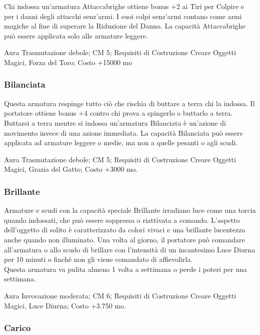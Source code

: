 \begin{multicols}{2}
Chi indossa un'armatura Attaccabrighe ottiene bonus +2 ai Tiri per Colpire e per i danni degli attacchi senz'armi. I suoi colpi senz'armi contano come armi magiche al fine di superare la Riduzione del Danno. La capacità Attaccabrighe può essere applicata solo alle armature leggere.

Aura Trasmutazione debole; CM 5; Requisiti di Costruzione Creare Oggetti Magici, Forza del Toro; Costo +15000 mo

\subsubsection{Bilanciata}

Questa armatura respinge tutto ciò che rischia di buttare a terra chi la indossa. Il portatore ottiene bonus +4 contro chi prova a spingerlo o buttarlo a terra.\\
Buttarsi a terra mentre si indossa un'armatura Bilanciata è un'azione di movimento invece di una azione immediata. La capacità Bilanciata può essere applicata ad armature leggere o medie, ma non a quelle pesanti o agli scudi.

Aura Trasmutazione debole; CM 5; Requisiti di Costruzione Creare Oggetti Magici, Grazia del Gatto; Costo +3000 mo.

\subsubsection{Brillante}

Armature e scudi con la capacità speciale Brillante irradiano luce come una torcia quando indossati, che può essere soppressa o riattivata a comando. L'aspetto dell'oggetto di solito è caratterizzato da colori vivaci e una brillante lucentezza anche quando non illuminato. Una volta al giorno, il portatore può comandare all'armatura o allo scudo di brillare con l'intensità di un incantesimo Luce Diurna per 10 minuti o finché non gli viene comandato di affievolirla.\\
Questa armatura va pulita almeno 1 volta a settimana o perde i poteri per una settimana.

Aura Invocazione moderata; CM 6; Requisiti di Costruzione Creare Oggetti Magici, Luce Diurna; Costo +3.750 mo.

\subsubsection{Carico}


\end{multicols}
